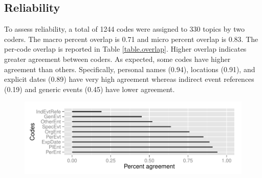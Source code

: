 \documentclass[runningheads,a4paper]{llncs}
\begin{document}
\subsection{Reliability}

To assess reliability, a total of 1244 codes were assigned to 330 topics by two coders. The macro percent overlap is 0.71 and  micro percent overlap is 0.83. The per-code overlap is reported in Table \ref{table.overlap}. Higher overlap indicates greater agreement between coders. As expected, some codes have higher agreement than others. Specifically, personal names (0.94), locations (0.91), and explicit dates (0.89) have very high agreement whereas indirect event references (0.19) and generic events (0.45) have lower agreement.

\begin{figure}
\includegraphics{plots/coder-agreement.pdf}
\end{figure}

\end{document}
